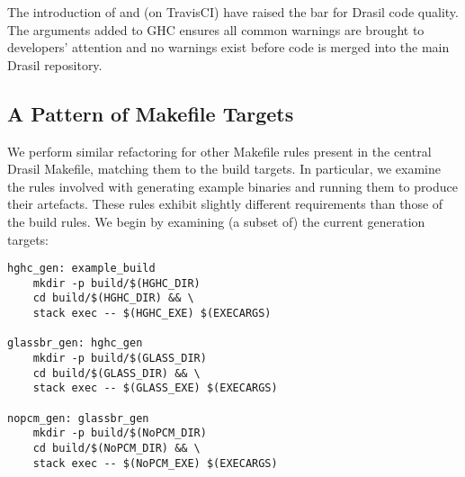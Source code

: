 {{%
%
%

The introduction of  and  (on TravisCI) have raised the bar for Drasil code quality. The arguments added to GHC ensures all common warnings are brought to developers' attention and no warnings exist before code is merged into the main Drasil repository.

\subsection{A Pattern of Makefile Targets}\label{bsRefactorEnd}

We perform similar refactoring for other Makefile rules present in the central Drasil Makefile, matching them to the build targets. In particular, we examine the rules involved with generating example binaries and running them to produce their artefacts. These rules exhibit slightly different requirements than those of the build rules. We begin by examining (a subset of) the current generation targets:

\begin{tcolorbox}[breakable, toprule at break=0pt, bottomrule at break=0pt]
\begin{verbatim}
hghc_gen: example_build
	mkdir -p build/$(HGHC_DIR)
	cd build/$(HGHC_DIR) && \
	stack exec -- $(HGHC_EXE) $(EXECARGS)

glassbr_gen: hghc_gen
	mkdir -p build/$(GLASS_DIR)
	cd build/$(GLASS_DIR) && \
	stack exec -- $(GLASS_EXE) $(EXECARGS)

nopcm_gen: glassbr_gen
	mkdir -p build/$(NoPCM_DIR)
	cd build/$(NoPCM_DIR) && \
	stack exec -- $(NoPCM_EXE) $(EXECARGS)
\end{verbatim}
\end{tcolorbox}

}}

